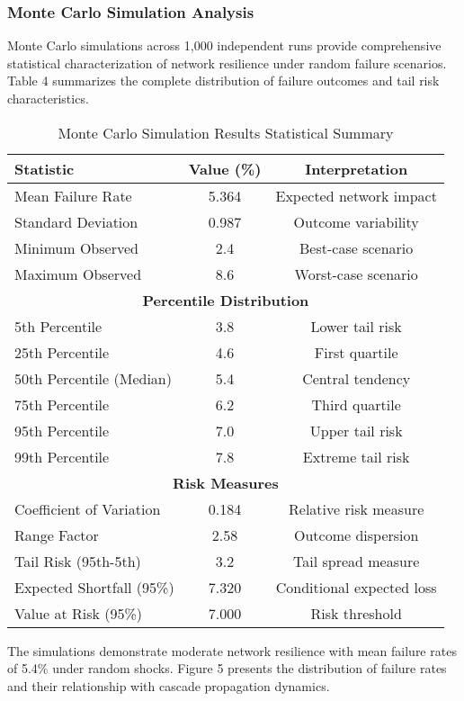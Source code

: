\documentclass[a4 paper, 11pt,twoside]{article}
\newcommand{\0}{\Bf{0}}
\theoremstyle{definition}
\begin{document}
\subsubsection{Monte Carlo Simulation Analysis}

Monte Carlo simulations across 1,000 independent runs provide comprehensive statistical characterization of network resilience under random failure scenarios. Table 4 summarizes the complete distribution of failure outcomes and tail risk characteristics.

\begin{table}[H]
\centering
\caption{Monte Carlo Simulation Results Statistical Summary}
\begin{tabular}{@{}lcc@{}}
\toprule
\textbf{Statistic} & \textbf{Value (\%)} & \textbf{Interpretation} \\
\midrule
Mean Failure Rate & 5.364 & Expected network impact \\
Standard Deviation & 0.987 & Outcome variability \\
Minimum Observed & 2.4 & Best-case scenario \\
Maximum Observed & 8.6 & Worst-case scenario \\
\midrule
\multicolumn{3}{c}{\textbf{Percentile Distribution}} \\
\midrule
5th Percentile & 3.8 & Lower tail risk \\
25th Percentile & 4.6 & First quartile \\
50th Percentile (Median) & 5.4 & Central tendency \\
75th Percentile & 6.2 & Third quartile \\
95th Percentile & 7.0 & Upper tail risk \\
99th Percentile & 7.8 & Extreme tail risk \\
\midrule
\multicolumn{3}{c}{\textbf{Risk Measures}} \\
\midrule
Coefficient of Variation & 0.184 & Relative risk measure \\
Range Factor & 2.58 & Outcome dispersion \\
Tail Risk (95th-5th) & 3.2 & Tail spread measure \\
Expected Shortfall (95\%) & 7.320 & Conditional expected loss \\
Value at Risk (95\%) & 7.000 & Risk threshold \\
\bottomrule
\end{tabular}
\end{table}

The simulations demonstrate moderate network resilience with mean failure rates of 5.4\% under random shocks. Figure 5 presents the distribution of failure rates and their relationship with cascade propagation dynamics.
\end{document}

